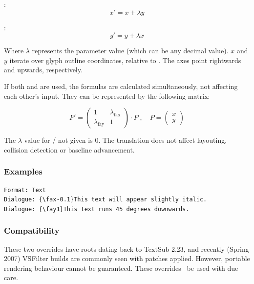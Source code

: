 \documentclass{spec}
\begin{document}
:
$$x' = x + \lambda y$$

:
$$y' = y + \lambda x$$

Where $\lambda$ represents the parameter value (which can be any decimal
value). $x$ and $y$ iterate over glyph outline coordinates, relative to
. The axes point rightwards and upwards, respectively.

If both  and  are used, the formulas are calculated
simultaneously, not affecting each other's input. They can be represented
by the following matrix:

$$P' = \begin{pmatrix}
1 & \lambda_{\text{fax}} \\
\lambda_{\text{fay}} & 1
\end{pmatrix} \cdot P\;, \quad P = \begin{pmatrix}x \\ y\end{pmatrix}$$

The $\lambda$ value for  /  not given is $0$. The translation
does not affect layouting, collision detection or baseline advancement.

\subsubsection*{Examples}
\begin{verbatim}
Format: Text
Dialogue: {\fax-0.1}This text will appear slightly italic.
Dialogue: {\fay1}This text runs 45 degrees downwards.
\end{verbatim}

\subsubsection*{Compatibility}
These two overrides have roots dating back to TextSub 2.23, and
recently (Spring 2007) VSFilter builds are commonly seen with
patches applied. However, portable rendering behaviour cannot
be guaranteed. These overrides \may\ be used with due care.
\end{document}
